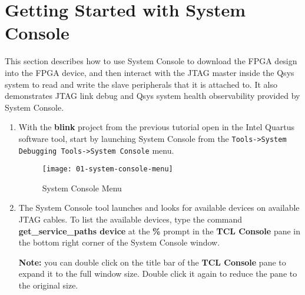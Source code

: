 \section*{Getting Started with System Console}

\begin{flushleft}
\noindent

This section describes how to use System Console to download the FPGA design into the FPGA device, and then interact with the JTAG master inside the Qsys system to read and write the slave peripherals that it is attached to.  It also demonstrates JTAG link debug and Qsys system health observability provided by System Console.

\begin{enumerate}[
	label=\textbf{Step \arabic*.},
	leftmargin=*,
	widest={00},
	align=left]

\item With the \textbf{blink} project from the previous tutorial open in the Intel Quartus software tool, start by launching System Console from the \texttt{Tools->System Debugging Tools->System Console} menu.

\begin{figure}[H]
\centering
\texttt{[image: 01-system-console-menu]}
\caption{System Console Menu}
\label{fig:01-system-console-menu}
\end{figure}

\newpage

\item The System Console tool launches and looks for available devices on available JTAG cables.  To list the available devices, type the command \textbf{get\_service\_paths device} at the \textbf{\%} prompt in the \textbf{TCL Console} pane in the bottom right corner of the System Console window.

\begin{tcolorbox}[
	colback=MyMintedBGColor,
	colframe=MyMintedBGColor,
	]

\textbf{Note:} you can double click on the title bar of the \textbf{TCL Console} pane to expand it to the full window size.  Double click it again to reduce the pane to the original size.


\end{tcolorbox}
\end{enumerate}
\end{flushleft}
